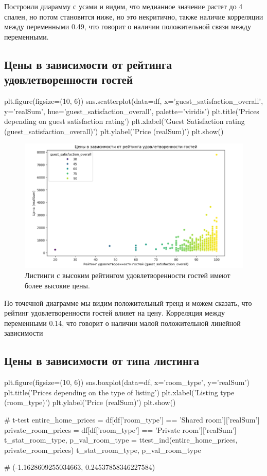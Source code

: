 \documentclass[
	11pt
] {article}
\begin{document}
	Построили диарамму с усами и видим, что медианное значение растет до 4 спален, но потом становится ниже, но это некритично, также наличие корреляции между переменными 0.49, что говорит о наличии положительной связи между переменными.


\subsection{Цены в зависимости от рейтинга удовлетворенности гостей}
\begin{python}
plt.figure(figsize=(10, 6))
sns.scatterplot(data=df, x='guest_satisfaction_overall', y='realSum', hue='guest_satisfaction_overall', palette='viridis')
plt.title('Prices depending on guest satisfaction rating')
plt.xlabel('Guest Satisfaction rating (guest_satisfaction_overall)')
plt.ylabel('Price (realSum)')
plt.show()
\end{python}

	\begin{figure}[H]
		\centering
		\includegraphics[width=1.0\textwidth]{fig-05}
		\caption{Листинги с высоким рейтингом удовлетворенности гостей имеют более высокие цены.}
	\end{figure}

	По точечной диаграмме мы видим положительный тренд и можем сказать, что рейтинг удовлетворенности гостей влияет на цену. Корреляция между переменными 0.14, что говорит о наличии малой положительной линейной зависимости


\subsection{Цены в зависимости от типа листинга}
\begin{python}
plt.figure(figsize=(10, 6))
sns.boxplot(data=df, x='room_type', y='realSum')
plt.title('Prices depending on the type of listing')
plt.xlabel('Listing type (room_type)')
plt.ylabel('Price (realSum)')
plt.show()

# t-test
entire_home_prices = df[df['room_type'] == 'Shared room']['realSum']
private_room_prices = df[df['room_type'] == 'Private room']['realSum']
t_stat_room_type, p_val_room_type = ttest_ind(entire_home_prices, private_room_prices)
t_stat_room_type, p_val_room_type

# (-1.1628609255034663, 0.24537858346227584)
\end{python}
\end{document}
